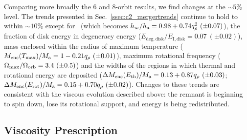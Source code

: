 
Comparing more broadly the 6 and 8-orbit results, we find changes at the $\sim\!5$\% level.  The trends presented in Sec.~\ref{ssec:c2_mergertrends} continue to hold to within $\sim\!10$\% except for \hxy\ (which becomes $\hxy/h_{\rm a} = 0.98 + 0.74q_\rho^2~(\pm0.07)$), the fraction of disk energy in degeneracy energy ($E_\mathrm{deg,disk}/E_\mathrm{I,disk} = 0.07~(\pm0.02)$), mass enclosed within the radius of maximum temperature ($\MencTmax/\Ma = 1-0.21q_\rho~(\pm 0.01)$), maximum rotational frequency ($\Omegamax/\Omegaorb = 3.4~(\pm0.5)$) and the widths of the regions in which thermal and rotational energy are deposited ($\MEthermthick/\Ma = 0.13 + 0.87q_\rho ~(\pm0.03)$; $\MErotthick/\Ma = 0.15 + 0.70q_\rho ~(\pm0.02)$).  Changes to these trends are consistent with the viscous evolution described above: the remnant is beginning to spin down, lose its rotational support, and energy is being redistributed.

\subsection{Viscosity Prescription}
\label{ssec:c2_viscprescrip}

